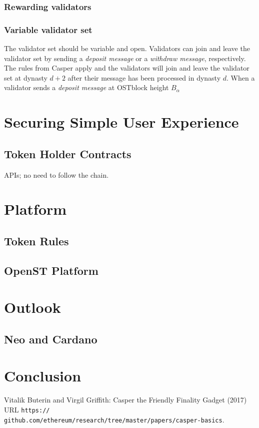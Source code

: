 \documentclass[12pt,a4paper,draft]{article}
\begin{document}
\subsubsection{Rewarding validators}

\subsubsection{Variable validator set}

The validator set should be variable and open.
Validators can join and leave the validator set by sending a \emph{deposit message} or a \emph{withdraw message}, respectively.
The rules from Casper apply and the validators will join and leave the validator set at dynasty $d+2$ after their message has been processed in dynasty $d$.
When a validator sends a \emph{deposit message} at OSTblock height $B_\alpha$

\section{Securing Simple User Experience}

\subsection{Token Holder Contracts}

APIs; no need to follow the chain.

\section{Platform}

\subsection{Token Rules}

\subsection{OpenST Platform}

\section{Outlook}

\subsection{Neo and Cardano}

\section{Conclusion}

\begin{thebibliography}{9}

  Vitalik Buterin and Virgil Griffith:
  Casper the Friendly Finality Gadget (2017) URL \texttt{https://\\github.com/ethereum/research/tree/master/papers/casper-basics}.

\end{thebibliography}
\end{document}
